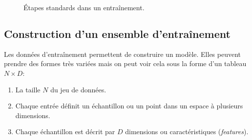 \documentclass[
  11pt,
  letterpaper,
  open=any,
  twoside=false,
  french]{scrbook}
\begin{document}
\begin{figure}


\caption{\label{fig-pipeline}Étapes standards dans un entraînement.}

\end{figure}%

\subsection{Construction d'un ensemble
d'entraînement}\label{sec-05.02.02}

Les données d'entraînement permettent de construire un modèle. Elles
peuvent prendre des formes très variées mais on peut voir cela sous la
forme d'un tableau \(N \times D\):

\begin{enumerate}
\def\labelenumi{\arabic{enumi}.}
\item
  La taille \(N\) du jeu de données.
\item
  Chaque entrée définit un échantillon ou un point dans un espace à
  plusieurs dimensions.
\item
  Chaque échantillon est décrit par \(D\) dimensions ou caractéristiques
  (\emph{features}).
\end{enumerate}
\end{document}
